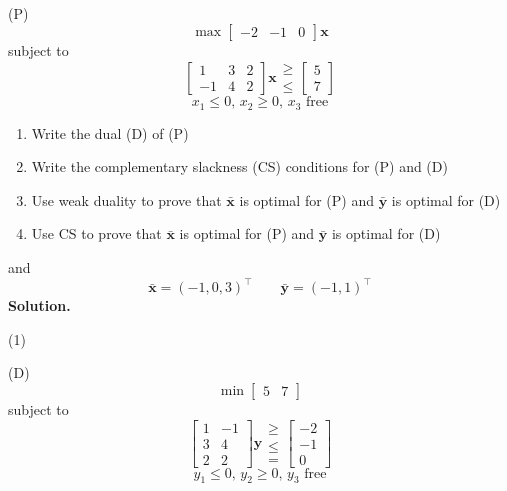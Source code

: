 \begin{exbox}
    \begin{example}
        (P)
        \[ \max
            \begin{bmatrix}
                -2 & -1 & 0
            \end{bmatrix}\bm{x} \]
        subject to
        \[
            \begin{bmatrix}
                1  & 3 & 2 \\
                -1 & 4 & 2
            \end{bmatrix}\bm{x}
            \begin{matrix}
                \geqslant \\
                \le
            \end{matrix}
            \begin{bmatrix}
                5 \\
                7
            \end{bmatrix}\]
        \[ x_1\leqslant 0,\,x_2\geqslant  0,\,x_3\text{ free} \]
        \begin{enumerate}[label=(\arabic*)]
            \item Write the dual (D) of (P)
            \item Write the complementary slackness (CS) conditions for (P) and (D)
            \item Use weak duality to prove that $ \bm{\bar{x}} $ is optimal for (P)
                  and $ \bm{\bar{y}} $ is optimal for (D)
            \item Use CS to prove that $ \bm{\bar{x}} $ is optimal for (P) and
                  $ \bm{\bar{y}} $ is optimal for (D)
        \end{enumerate}
        and
        \[ \bm{\bar{x}}=(-1,0,3)^\top\qquad \bm{\bar{y}}=(-1,1)^\top \]
        \textbf{Solution.}

        (1)

        (D)
        \[ \min
            \begin{bmatrix}
                5 & 7
            \end{bmatrix} \]
        subject to
        \[
            \begin{bmatrix}
                1 & -1 \\
                3 & 4  \\
                2 & 2
            \end{bmatrix}\bm{y}
            \begin{matrix}
                \geqslant \\
                \le       \\
                =
            \end{matrix}
            \begin{bmatrix}
                -2 \\
                -1 \\
                0
            \end{bmatrix}\]
        \[ y_1\leqslant 0,\,y_2\geqslant  0,\,y_3\text{ free} \]


\end{example}
\end{exbox}
